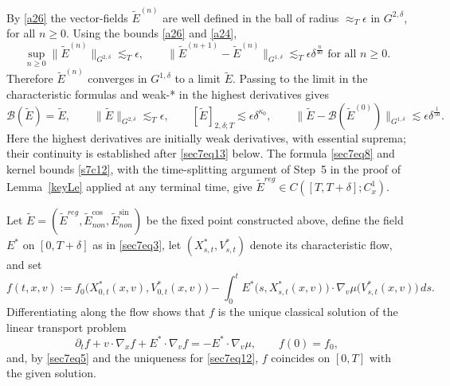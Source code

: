 \documentclass[reqno,11pt]{amsart}
\numberwithin{equation}{section}
\begin{document}
	By \eqref{a26} the vector-fields $\tilde{E}^{(n)}$ are well defined in the ball of radius $\approx_T\epsilon$ in $G^{2,\delta}$, for all $n\geq 0$. Using the bounds \eqref{a26} and \eqref{a24}, 
	\begin{equation}\label{picard-uniform-two}
	\sup_{n\geq0}\|\tilde E^{(n)}\|_{G^{2,\delta}}\lesssim_T \epsilon,\qquad \|\tilde E^{(n+1)}-\tilde E^{(n)}\|_{G^{1,\delta}}\lesssim_T \epsilon \delta^{\frac{n}{40}}\text{ for all }n\geq 0.
	\end{equation}
	\begingroup
	Therefore \(\widetilde E^{(n)}\) converges in \(G^{1,\delta}\) to a limit \(\widetilde E\).
	Passing to the limit in the characteristic formulas and weak-* in the highest derivatives gives
	\endgroup
	\begin{equation}\label{limit-order-two}
	 \mathcal{B}(\tilde{E})=\tilde{E},\qquad \|\tilde E\|_{G^{2,\delta}}\lesssim_T\epsilon,\qquad [\tilde E]_{2,\delta;T}
	\lesssim\epsilon\delta^{\kappa_0},\qquad\|\tilde E-\mathcal{B}(\tilde E^{(0)})\|_{G^{1,\delta}}\lesssim \epsilon\delta^{\frac1{50}}.
	\end{equation}
	\begingroup
	Here the highest derivatives are initially weak derivatives, with essential suprema;
	their continuity is established after \eqref{sec7eq13} below.
	The formula \eqref{sec7eq8} and kernel bounds \eqref{s7c12}, with the
	time-splitting argument of Step~5 in the proof of Lemma~\ref{keyLe}
	applied at any terminal time, give
	$\widetilde E^{reg}\in C([T,T+\delta];C_x^1)$.
	\endgroup


	Let $\widetilde E=(\widetilde E^{reg},\widetilde E^{\cos}_{non},\widetilde E^{\sin}_{non})$
	be the fixed point constructed above, define the field $E^\ast$ on $[0,T+\delta]$ as in
	\eqref{sec7eq3}, let $(X^\ast_{s,t},V^\ast_{s,t})$ denote its characteristic flow, and set
	\begin{equation}\label{sec7eq11}
		f(t,x,v):=
		f_0\bigl(X^\ast_{0,t}(x,v),V^\ast_{0,t}(x,v)\bigr)
		-\int_0^t E^\ast\bigl(s,X^\ast_{s,t}(x,v)\bigr)\cdot
		\nabla_v\mu\bigl(V^\ast_{s,t}(x,v)\bigr)\,ds .
	\end{equation}
	Differentiating along the flow shows that $f$ is the unique classical solution of the
	linear transport problem
	\begin{equation}\label{sec7eq12}
		\partial_tf+v\cdot\nabla_xf+E^\ast\cdot\nabla_vf=-E^\ast\cdot\nabla_v\mu,
		\qquad f(0)=f_0 ,
	\end{equation}
	and, by \eqref{sec7eq5} and the uniqueness for \eqref{sec7eq12}, $f$ coincides on $[0,T]$
	with the given solution. 
	\medskip
	
\end{document}
